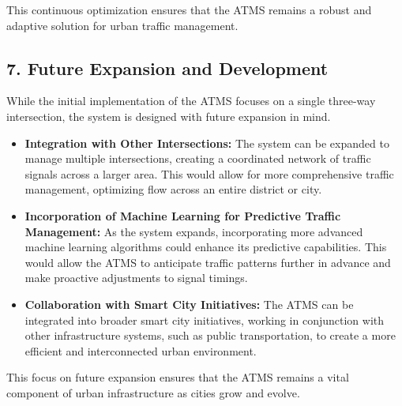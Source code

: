 \documentclass{scrreprt}
\begin{document}
This continuous optimization ensures that the ATMS remains a robust and adaptive solution for urban traffic management.

\subsection*{7. Future Expansion and Development}

While the initial implementation of the ATMS focuses on a single three-way intersection, the system is designed with future expansion in mind.

\begin{itemize}
    \item \textbf{Integration with Other Intersections:} 
    The system can be expanded to manage multiple intersections, creating a coordinated network of traffic signals across a larger area. This would allow for more comprehensive traffic management, optimizing flow across an entire district or city.

    \item \textbf{Incorporation of Machine Learning for Predictive Traffic Management:} 
    As the system expands, incorporating more advanced machine learning algorithms could enhance its predictive capabilities. This would allow the ATMS to anticipate traffic patterns further in advance and make proactive adjustments to signal timings.

    \item \textbf{Collaboration with Smart City Initiatives:} 
    The ATMS can be integrated into broader smart city initiatives, working in conjunction with other infrastructure systems, such as public transportation, to create a more efficient and interconnected urban environment.
\end{itemize}

This focus on future expansion ensures that the ATMS remains a vital component of urban infrastructure as cities grow and evolve.
\end{document}
